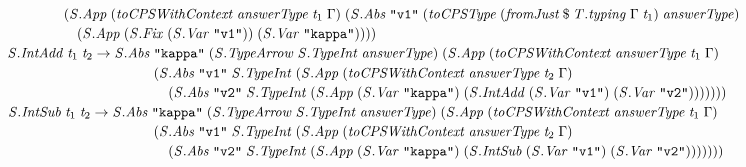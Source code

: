 \documentclass[10pt]{article}
\newcommand{\Conid}[1]{\mathit{#1}}
\newcommand{\Varid}[1]{\mathit{#1}}
\begin{document}
\begin{hscode}
${\hskip1.00em\relax\hskip1.00em\relax\hskip1.00em\relax\hskip1.00em\relax\hskip1.00em\relax\hskip1.00em\relax(\Conid{\Conid{S}.App}\;(\Varid{toCPSWithContext}\;\Varid{answerType}\;\Varid{t}_{1}\;\Gamma)\;(\Conid{\Conid{S}.Abs}\;\text{\tt \char34 v1\char34}\;(\Varid{toCPSType}\;(\Varid{fromJust}\mathbin{\$}\Varid{\Conid{T}.typing}\;\Gamma\;\Varid{t}_{1})\;\Varid{answerType})}$\\
${\hskip1.00em\relax\hskip1.00em\relax\hskip1.00em\relax\hskip1.00em\relax\hskip1.00em\relax\hskip1.00em\relax\hskip1.00em\relax(\Conid{\Conid{S}.App}\;(\Conid{\Conid{S}.Fix}\;(\Conid{\Conid{S}.Var}\;\text{\tt \char34 v1\char34}))\;(\Conid{\Conid{S}.Var}\;\text{\tt \char34 kappa\char34}))))}$\\
${\hskip1.00em\relax\hskip1.00em\relax\Conid{\Conid{S}.IntAdd}\;\Varid{t}_{1}\;\Varid{t}_{2}\to \Conid{\Conid{S}.Abs}\;\text{\tt \char34 kappa\char34}\;(\Conid{\Conid{S}.TypeArrow}\;\Conid{\Conid{S}.TypeInt}\;\Varid{answerType})\;(\Conid{\Conid{S}.App}\;(\Varid{toCPSWithContext}\;\Varid{answerType}\;\Varid{t}_{1}\;\Gamma)}$\\
${\hskip1.00em\relax\hskip1.00em\relax\hskip10.50em\relax(\Conid{\Conid{S}.Abs}\;\text{\tt \char34 v1\char34}\;\Conid{\Conid{S}.TypeInt}\;(\Conid{\Conid{S}.App}\;(\Varid{toCPSWithContext}\;\Varid{answerType}\;\Varid{t}_{2}\;\Gamma)}$\\
${\hskip1.00em\relax\hskip1.00em\relax\hskip10.50em\relax\hskip1.00em\relax(\Conid{\Conid{S}.Abs}\;\text{\tt \char34 v2\char34}\;\Conid{\Conid{S}.TypeInt}\;(\Conid{\Conid{S}.App}\;(\Conid{\Conid{S}.Var}\;\text{\tt \char34 kappa\char34})\;(\Conid{\Conid{S}.IntAdd}\;(\Conid{\Conid{S}.Var}\;\text{\tt \char34 v1\char34})\;(\Conid{\Conid{S}.Var}\;\text{\tt \char34 v2\char34})))))))}$\\
${\hskip1.00em\relax\hskip1.00em\relax\Conid{\Conid{S}.IntSub}\;\Varid{t}_{1}\;\Varid{t}_{2}\to \Conid{\Conid{S}.Abs}\;\text{\tt \char34 kappa\char34}\;(\Conid{\Conid{S}.TypeArrow}\;\Conid{\Conid{S}.TypeInt}\;\Varid{answerType})\;(\Conid{\Conid{S}.App}\;(\Varid{toCPSWithContext}\;\Varid{answerType}\;\Varid{t}_{1}\;\Gamma)}$\\
${\hskip1.00em\relax\hskip1.00em\relax\hskip10.50em\relax(\Conid{\Conid{S}.Abs}\;\text{\tt \char34 v1\char34}\;\Conid{\Conid{S}.TypeInt}\;(\Conid{\Conid{S}.App}\;(\Varid{toCPSWithContext}\;\Varid{answerType}\;\Varid{t}_{2}\;\Gamma)}$\\
${\hskip1.00em\relax\hskip1.00em\relax\hskip10.50em\relax\hskip1.00em\relax(\Conid{\Conid{S}.Abs}\;\text{\tt \char34 v2\char34}\;\Conid{\Conid{S}.TypeInt}\;(\Conid{\Conid{S}.App}\;(\Conid{\Conid{S}.Var}\;\text{\tt \char34 kappa\char34})\;(\Conid{\Conid{S}.IntSub}\;(\Conid{\Conid{S}.Var}\;\text{\tt \char34 v1\char34})\;(\Conid{\Conid{S}.Var}\;\text{\tt \char34 v2\char34})))))))}$\\

\end{hscode}
\end{document}
